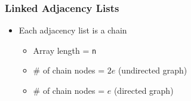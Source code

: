 \documentclass[newPxFont,sthlmFooter,nooffset]{beamer}
\begin{document}
\begin{frame}[t]
  \frametitle{Linked Adjacency Lists}
  \begin{itemize}
  \item Each adjacency list is a chain
    \begin{itemize}
    \item Array length = \texttt{n}
    \item $\#$ of chain nodes = $2e$ (undirected graph)
    \item $\#$ of chain nodes = $e$ (directed graph)
    \end{itemize}
  \end{itemize}
    \begin{columns}
      \begin{column}{0.3\textwidth}
      \end{column}
      \begin{column}{0.6\textwidth}
      \end{column}
    \end{columns}

\end{frame}
\end{document}
